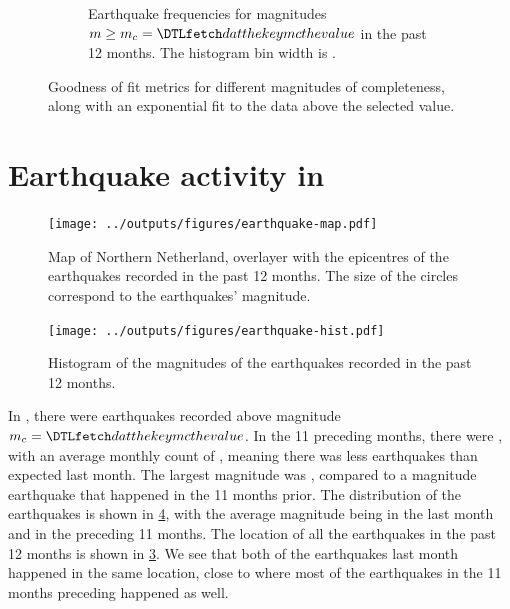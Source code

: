 \documentclass[11pt]{article}
\begin{document}
\begin{figure}[htp]
\begin{subfigure}[b]{0.49\textwidth}
    \caption{Earthquake frequencies for magnitudes $m\geq m_c=\dat{mc}$ in the past 12 months. The histogram bin width is .}
    \label{fig:hist}
\end{subfigure}
\caption{Goodness of fit metrics for different magnitudes of completeness, along with an exponential fit
to the data above the selected value.}
\label{fig:figs1}
\end{figure}

\newpage

\section*{Earthquake activity in }%

\begin{figure}[htp]
\begin{center}
    \texttt{[image: ../outputs/figures/earthquake-map.pdf]}
\end{center}
\caption{Map of Northern Netherland, overlayer with the epicentres of the earthquakes recorded in the past 12 months.
The size of the circles correspond to the earthquakes' magnitude.}
\label{fig:map}
\end{figure}

\begin{figure}[htp]
\begin{center}
    \texttt{[image: ../outputs/figures/earthquake-hist.pdf]}
\end{center}
\caption{Histogram of the magnitudes of the earthquakes recorded in the past 12 months.}
\label{fig:hist}
\end{figure}

In , there were  earthquakes recorded above magnitude
$m_c=\dat{mc}$. In the 11 preceding months, there were , with an average monthly
count of , meaning there was less earthquakes than expected last month.
The largest magnitude was , compared to a magnitude  earthquake that
happened in the 11 months prior. The distribution of the earthquakes is shown in \cref{fig:hist}, with the
average magnitude being  in the last month and  in the preceding 11 months.
The location of all the earthquakes in the past 12 months is shown in \cref{fig:map}.
We see that both of the earthquakes last month happened in the same location, close to where most of the earthquakes in the
11 months preceding happened as well.
\end{document}
